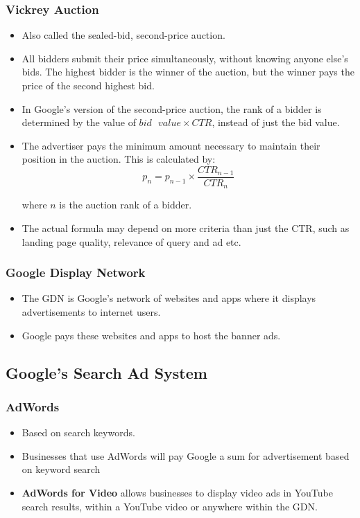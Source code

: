 \documentclass{article}
\begin{document}
\subsubsection{Vickrey Auction}
\begin{itemize}
    \item Also called the sealed-bid, second-price auction. 
    
    \item All bidders submit their price simultaneously, without knowing anyone else's bids. The highest bidder is the winner of the auction, but the winner pays the price of the second highest bid. 
    
    \item In Google's version of the second-price auction, the rank of a bidder is determined by the value of $bid\text{ }value \times CTR$, instead of just the bid value.
    
    \item The advertiser pays the minimum amount necessary to maintain their position in the auction. This is calculated by:
    \begin{equation*}
        p_n = p_{n-1} \times \frac{CTR_{n-1}}{CTR_n} 
    \end{equation*}
    
    where $n$ is the auction rank of a bidder. 
    
    \item The actual formula may depend on more criteria than just the CTR, such as landing page quality, relevance of query and ad etc.
\end{itemize}

\subsubsection{Google Display Network}
\begin{itemize}
    \item The GDN is Google's network of websites and apps where it displays advertisements to internet users.
    
    \item Google pays these websites and apps to host the banner ads.
\end{itemize}

\subsection{Google's Search Ad System}
\subsubsection{AdWords}
\begin{itemize}
    \item Based on search keywords. 
    
    \item Businesses that use AdWords will pay Google a sum for advertisement based on keyword search
    
    \item \textbf{AdWords for Video} allows businesses to display video ads in YouTube search results, within a YouTube video or anywhere within the GDN. 
\end{itemize}
\end{document}
